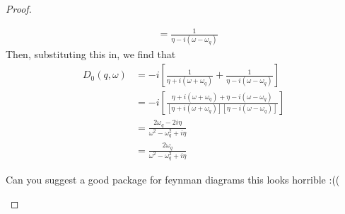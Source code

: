 \begin{proof}
\begin{parts}
\begin{align*}
								    &= \frac{1}{\eta - i(\omega-\omega_q)} 
	\end{align*}
	Then, substituting this in, we find that
	\begin{align*}
		D_0(q, \omega) &= -i \left[ \frac{1}{\eta + i(\omega+\omega_q)}+ \frac{1}{\eta - i(\omega - \omega_q)} \right]\\ 
			       &= -i \left[ \frac{\eta + i(\omega + \omega_q) + \eta - i(\omega - \omega_q)}{[\eta + i(\omega + \omega_q)][\eta - i(\omega - \omega_q)]} \right]\\
			       &= \frac{2\omega_q - 2i\eta}{\omega^2 -\omega_q^2 + i\eta} \\
			       &= \frac{2\omega_q}{\omega^2 - \omega_q^2+i\eta} 
	\end{align*}
\item Can you suggest a good package for feynman diagrams this looks horrible :((

\end{parts}
\end{proof}
